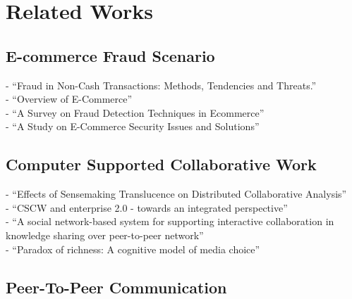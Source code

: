 
\chapter{Related Works}
\label{cha:related_works}


\section{E-commerce Fraud Scenario}
\label{sec:related_e_commerce}

- ``Fraud in Non-Cash Transactions: Methods, Tendencies and Threats.'' \citep{sobko2014fraud} \\
- ``Overview of E-Commerce'' \citep{ankhule2015overview} \\
- ``A Survey on Fraud Detection Techniques in Ecommerce'' \citep{rana2015survey} \\
- ``A Study on E-Commerce Security Issues and Solutions'' \citep{sen2015study}


\section{Computer Supported Collaborative Work}
\label{sec:related_cscw}

- ``Effects of Sensemaking Translucence on Distributed Collaborative Analysis'' \citep{goyaleffects} \\
- ``CSCW and enterprise 2.0 - towards an integrated perspective'' \citep{Koch2008} \\
- ``A social network-based system for supporting interactive collaboration in knowledge sharing over peer-to-peer network'' \citep{yang2008social} \\
- ``Paradox of richness: A cognitive model of media choice'' \citep{robert2005paradox}


\section{Peer-To-Peer Communication}
\label{sec:related_p2p}

